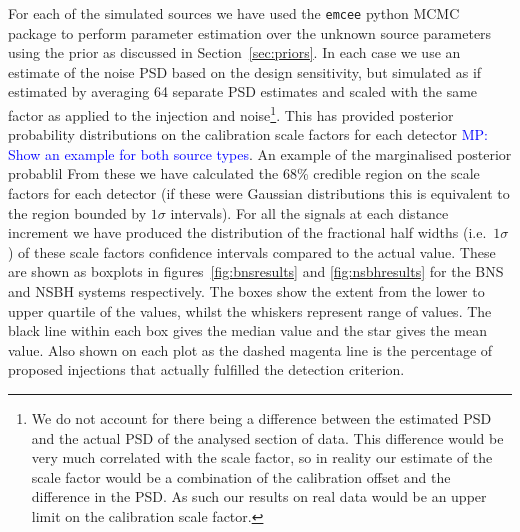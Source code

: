 \documentclass[10pt]{iopart}
\newcommand{\MP}[1]{\textcolor{blue}{MP: #1}}
\begin{document}
For each of the simulated sources we have used the {\tt emcee} python MCMC package to perform 
parameter estimation over the unknown source parameters using the prior as discussed in 
Section~\ref{sec:priors}. In each case we use an estimate of the noise PSD based on the design 
sensitivity, but simulated as if estimated by averaging 64 separate PSD estimates and scaled with 
the same factor as applied to the injection and noise\footnote{We do not account for there being 
a difference between the estimated PSD and the actual PSD of the analysed section of data. This 
difference would be very much correlated with the scale factor, so in reality our estimate of the 
scale factor would be a combination of the calibration offset and the difference in the PSD. As 
such our results on real data would be an upper limit on the calibration scale factor.}. This has 
provided posterior probability distributions on the calibration scale factors for each detector 
\MP{Show an example for both source types}. An example of the marginalised posterior probablil From 
these we have calculated the 68\% credible region 
on the scale factors for each detector (if these were Gaussian distributions this is equivalent to 
the region bounded by $1\sigma$ intervals). For all the signals at each distance increment we have 
produced the distribution of the fractional half widths (i.e.\ $1\sigma$) of these scale factors 
confidence intervals compared to the actual value. These are shown as boxplots in 
figures~\ref{fig:bnsresults} and \ref{fig:nsbhresults} for the \ac{BNS} and \ac{NSBH} systems 
respectively. The boxes show the extent from the lower to upper quartile of the values, whilst the 
whiskers represent range of values. The black line within each box gives the median value and the 
star gives the mean value. Also shown on each plot as the dashed magenta line is the percentage of 
proposed injections that actually fulfilled the detection criterion.
\end{document}
